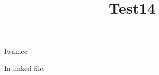 \documentclass[reqno]{amsart} 
\title{Test14}
\begin{document}
Iwaniec \cite{Iwaniec1992}

In linked file: \cite{JN19a}

{} 
\end{document}
